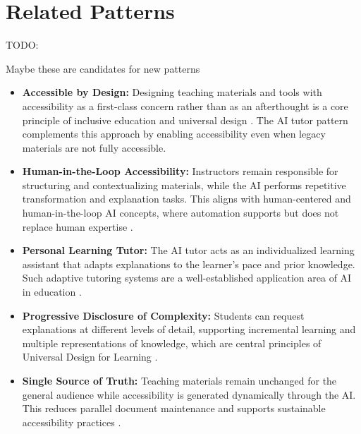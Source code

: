 \section{Related Patterns}
TODO:

Maybe these are candidates for new patterns

\begin{itemize}
    \item \textbf{Accessible by Design:} Designing teaching materials and tools with accessibility as a first-class concern rather than as an afterthought is a core principle of inclusive education and universal design \cite{w3c2023,burgstahler2015}. The AI tutor pattern complements this approach by enabling accessibility even when legacy materials are not fully accessible.
    \item \textbf{Human-in-the-Loop Accessibility:} Instructors remain responsible for structuring and contextualizing materials, while the AI performs repetitive transformation and explanation tasks. This aligns with human-centered and human-in-the-loop AI concepts, where automation supports but does not replace human expertise \cite{shneiderman2020,ieee2019}.
    \item \textbf{Personal Learning Tutor:} The AI tutor acts as an individualized learning assistant that adapts explanations to the learner’s pace and prior knowledge. Such adaptive tutoring systems are a well-established application area of AI in education \cite{holmes2019}.
    \item \textbf{Progressive Disclosure of Complexity:} Students can request explanations at different levels of detail, supporting incremental learning and multiple representations of knowledge, which are central principles of Universal Design for Learning \cite{burgstahler2015,al-azawei2016}.
    \item \textbf{Single Source of Truth:} Teaching materials remain unchanged for the general audience while accessibility is generated dynamically through the AI. This reduces parallel document maintenance and supports sustainable accessibility practices \cite{lazar2015}.
\end{itemize}
